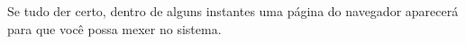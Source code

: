 \begin{itemize}
            Se tudo der certo, dentro de alguns instantes uma página do navegador aparecerá para que você possa mexer no sistema.
        \begin{comment}
            
        \item \textbf{Manual do usuário}: Os passos básicos para utilizar o sistema (inicializar, salvar, imprimir, etc.)
        \item \textbf{Outros}....
        \end{comment}
    \end{itemize}

\begin{comment}
    Prof. Dr. Ausberto S. Castro Vera
    UENF - CCT - LCMAT - Curso de Ci\^{e}ncia da Computação
    Campos, RJ, 2022 
    Disciplina: Paradigma de Desenvolvimento Orientado a Objetos
    Aluno: João Vítor Fernandes Dias
\end{comment}